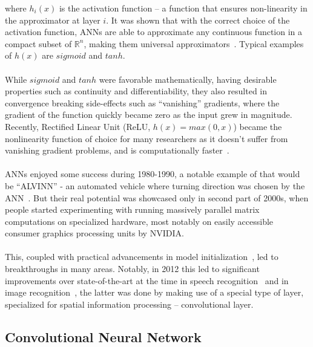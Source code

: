 \noindent where $h_i(x)$ is the activation function -- a function that ensures non-linearity in the approximator at layer $i$. It was shown that with the correct choice of the activation function, ANNs are able to approximate any continuous function in a compact subset of $\mathbb{R}^n$, making them universal approximators~\cite{Hornik1991}. Typical examples of $h(x)$ are $sigmoid$ and $tanh$.
\\\\
While $sigmoid$ and $tanh$ were favorable mathematically, having desirable properties such as continuity and differentiability, they also resulted in convergence breaking side-effects such as “vanishing” gradients, where the gradient of the function quickly became zero as the input grew in magnitude. Recently, Rectified Linear Unit (ReLU, $h(x) = max(0, x)$) became the nonlinearity function of choice for many researchers as it doesn’t suffer from vanishing gradient problems, and is computationally faster~\cite{Nair2010}. 
\\\\
ANNs enjoyed some success during 1980-1990, a notable example of that would be “ALVINN” - an automated vehicle where turning direction was chosen by the ANN~\cite{Pomerleau1989}. But their real potential was showcased only in second part of 2000s, when people started experimenting with running massively parallel matrix computations on specialized hardware, most notably on easily accessible consumer graphics processing units by NVIDIA.
\\\\
This, coupled with practical advancements in model initialization~\cite{Hinton2006}, led to breakthroughs in many areas. Notably, in 2012 this led to significant improvements over state-of-the-art at the time in speech recognition~\cite{Dahl2012} and in image recognition~\cite{Krizhevsky2012}, the latter was done by making use of a special type of layer, specialized for spatial information processing -- convolutional layer.

\subsection{Convolutional Neural Network}

